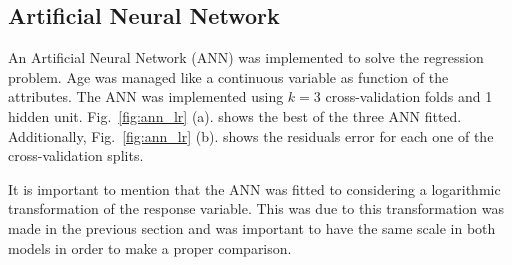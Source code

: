 \documentclass[10pt, paper=a4]{article}
\begin{document}
\subsection{Artificial Neural Network}
An Artificial Neural Network (ANN) was implemented to solve the regression problem. Age was managed like a continuous variable as function of the attributes. The ANN was implemented using $k=3$ cross-validation folds and 1 hidden unit. Fig.~\ref{fig:ann_lr} (a). shows the best of the three ANN fitted. Additionally, Fig.~\ref{fig:ann_lr} (b). shows the residuals error for each one of the cross-validation splits.

It is important to mention that the ANN was fitted to considering a logarithmic transformation of the response variable. This was due to this transformation was made in the previous section and was important to have the same scale in both models in order to make a proper comparison.
\end{document}
